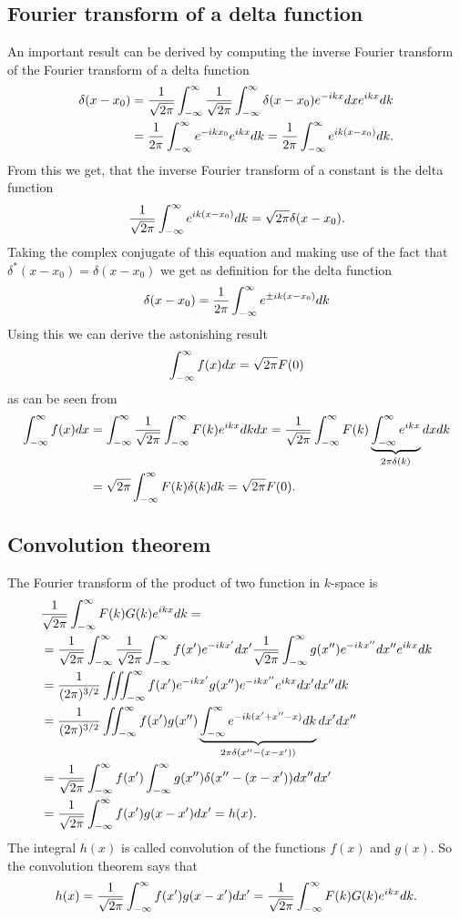 \subsection{Fourier transform of a delta function}
An important result can be derived by computing the inverse Fourier
transform of the Fourier transform of a delta function
\begin{align*}
\delta(x-x_0) &= \frac{1}{\sqrt{2\pi}}\int_{-\infty}^{\infty}\frac{1}{\sqrt{2\pi}}\int_{-\infty}^{\infty} \delta(x-x_0) e^{-ikx} dx e^{ikx} dk\\
&=\frac{1}{2\pi}\int_{-\infty}^{\infty} e^{-ikx_0} e^{ikx} dk = \frac{1}{2\pi}\int_{-\infty}^{\infty} e^{ik(x-x_0)} dk.
\end{align*}
From this we get, that the inverse Fourier transform of a
constant is the delta function
\begin{align*}
\frac{1}{\sqrt{2\pi}}\int_{-\infty}^{\infty} e^{ik(x-x_0)} dk = \sqrt{2\pi} \delta(x-x_0).
\end{align*}
Taking the complex conjugate of this equation and making use of the fact
that $\delta^*(x-x_0) = \delta(x-x_0)$ we get as definition for the delta
function
\begin{align}
\delta(x-x_0)= \frac{1}{2\pi}\int_{-\infty}^{\infty} e^{\pm ik(x-x_0)} dk
\end{align}
Using this we can derive the astonishing result
\begin{align}
\int_{-\infty}^{\infty} f(x) dx = \sqrt{2\pi} F(0)
\end{align}
as can be seen from
\begin{align*}
\int_{-\infty}^{\infty} f(x) dx &= \int_{-\infty}^{\infty} \frac{1}{\sqrt{2\pi}} \int_{-\infty}^{\infty} F(k) e^{ikx} dk dx 
= \frac{1}{\sqrt{2\pi}} \int_{-\infty}^{\infty} F(k) \underbrace{\int_{-\infty}^{\infty} e^{ikx}}_{2\pi \delta(k)} dx dk\\
&= \sqrt{2\pi} \int_{-\infty}^{\infty} F(k) \delta(k) dk = \sqrt{2\pi} F(0).
\end{align*}

\subsection{Convolution theorem}
The Fourier transform of the product of two function in $k$-space is
\begin{align*}
&\frac{1}{\sqrt{2\pi}}\int_{-\infty}^{\infty} F(k) G(k) e^{ikx} dk =\\
&= \frac{1}{\sqrt{2\pi}} \int_{-\infty}^{\infty} \frac{1}{\sqrt{2\pi}} \int_{-\infty}^{\infty} f(x') e^{-ikx'} dx' \frac{1}{\sqrt{2\pi}}\int_{-\infty}^{\infty} g(x'') e^{-ikx''} dx''
e^{ikx} dk\\
&=\frac{1}{(2\pi)^{3/2}} \iiint^{\infty}_{-\infty} f(x') e^{-ikx'} g(x'') e^{-ikx''} e^{ikx} dx' dx'' dk\\
&=\frac{1}{(2\pi)^{3/2}} \iint_{-\infty}^{\infty} f(x') g(x'') 
\underbrace{\int_{-\infty}^{\infty} e^{-ik(x'+x''-x)} dk}_{2\pi \delta(x''-(x-x'))} dx' dx'' \\
&=\frac{1}{\sqrt{2\pi}}\int_{-\infty}^{\infty} f(x') \int_{-\infty}^{\infty} g(x'') \delta(x''-(x-x')) dx'' dx' \\
&=\frac{1}{\sqrt{2\pi}} \int_{-\infty}^{\infty} f(x') g(x-x') dx' = h(x).
\end{align*}
The integral $h(x)$ is called convolution of the functions $f(x)$ and $g(x)$.
So the convolution theorem says that
\begin{align}
h(x) = \frac{1}{\sqrt{2\pi}} \int_{-\infty}^{\infty} f(x') g(x-x') dx' = \frac{1}{\sqrt{2\pi}}\int_{-\infty}^{\infty} F(k) G(k) e^{ikx} dk.
\end{align}

